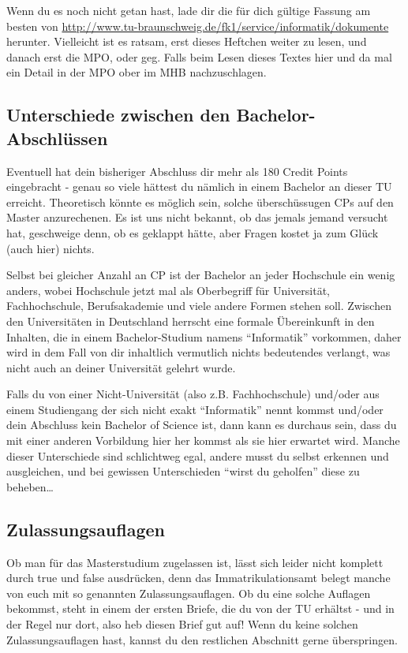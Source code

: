 Wenn du es noch nicht getan hast, lade dir die für dich gültige Fassung am besten von \url{http://www.tu-braunschweig.de/fk1/service/informatik/dokumente} herunter. Vielleicht ist es ratsam, erst dieses Heftchen weiter zu lesen, und danach erst die MPO, oder geg. Falls beim Lesen dieses Textes hier und da mal ein Detail in der MPO ober im MHB nachzuschlagen.

\subsection{Unterschiede zwischen den Bachelor-Abschlüssen}
Eventuell hat dein bisheriger Abschluss dir mehr als 180 Credit Points eingebracht - genau so viele hättest du nämlich in einem Bachelor an dieser TU erreicht. Theoretisch könnte es möglich sein, solche überschüssugen CPs auf den Master anzurechenen. Es ist uns nicht bekannt, ob das jemals jemand versucht hat, geschweige denn, ob es geklappt hätte, aber Fragen kostet ja zum Glück (auch hier) nichts.

Selbst bei gleicher Anzahl an CP ist der Bachelor an jeder Hochschule ein wenig anders, wobei Hochschule jetzt mal als Oberbegriff für Universität, Fachhochschule, Berufsakademie und viele andere Formen stehen soll. Zwischen den Universitäten in Deutschland herrscht eine formale Übereinkunft in den Inhalten, die in einem Bachelor-Studium namens "`Informatik"' vorkommen, daher wird in dem Fall von dir inhaltlich vermutlich nichts bedeutendes verlangt, was nicht auch an deiner Universität gelehrt wurde.

Falls du von einer Nicht-Universität (also z.B. Fachhochschule) und/oder aus einem Studiengang der sich nicht exakt "`Informatik"' nennt kommst und/oder dein Abschluss kein Bachelor of Science ist, dann kann es durchaus sein, dass du mit einer anderen Vorbildung hier her kommst als sie hier erwartet wird. Manche dieser Unterschiede sind schlichtweg egal, andere musst du selbst erkennen und ausgleichen, und bei gewissen Unterschieden "`wirst du geholfen"' diese zu beheben\ldots

\subsection{Zulassungsauflagen}
Ob man für das Masterstudium zugelassen ist, lässt sich leider nicht komplett durch true und false ausdrücken, denn das Immatrikulationsamt belegt manche von euch mit so genannten Zulassungsauflagen. Ob du eine solche Auflagen bekommst, steht in einem der ersten Briefe, die du von der TU erhältst - und in der Regel nur dort, also heb diesen Brief gut auf! Wenn du keine solchen Zulassungsauflagen hast, kannst du den restlichen Abschnitt gerne überspringen.

